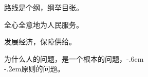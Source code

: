 \null%
\vspace{1.5\baselineskip}
\sffamily%
\begin{center}
{%
	\huge\bfseries%
	{}
}
\end{center}

\begingroup%
\Large\bfseries%
\doublespacing%
\setlength{\parindent}{1.8em}%

路线是个纲，纲举目张。

全心全意地为人民服务。

发展经济，保障供给。

为什么人的问题，是一个根本的问题，\kern-.6em\\
\kern-.2em原则的问题。

\endgroup

